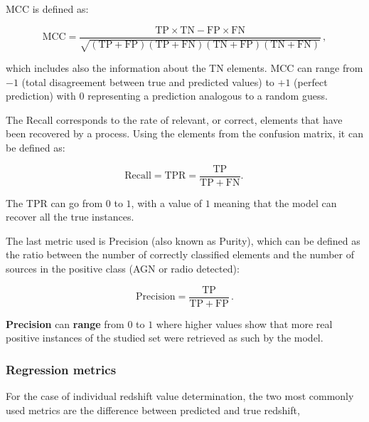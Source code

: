 \documentclass{aa}
\begin{document}
MCC is defined as:

\begin{equation}\label{eq:mcc}
\mathrm{MCC} = \frac{\mathrm{TP} \times \mathrm{TN} - \mathrm{FP} \times \mathrm{FN}}{\sqrt{(\mathrm{TP} + \mathrm{FP}) (\mathrm{TP} + \mathrm{FN}) (\mathrm{TN} + \mathrm{FP}) (\mathrm{TN} + \mathrm{FN})}}\,,
\end{equation}

\noindent which includes also the information about the TN elements. MCC can range from $-1$ (total disagreement between true and predicted values) to $+1$ (perfect prediction) with $0$ representing a prediction analogous to a random guess.

The Recall \citep[also called Completeness, Sensitivity, or True Positive Rate -TPR-;][]{10.2307/4586294} corresponds to the rate of relevant, or correct, elements that have been recovered by a process. Using the elements from the confusion matrix, it can be defined as:

\begin{equation}\label{eq:recall}
\mathrm{Recall} = \mathrm{TPR} = \frac{\mathrm{TP}}{\mathrm{TP} + \mathrm{FN}}.\,
\end{equation}

The TPR can go from $0$ to $1$, with a value of $1$ meaning that the model can recover all the true instances. 

The last metric used is Precision (also known as Purity), which can be defined as the ratio between the number of correctly classified elements and the number of sources in the positive class (AGN or radio detected): 

\begin{equation}\label{eq:precision}
\mathrm{Precision} = \frac{\mathrm{TP}}{\mathrm{TP} + \mathrm{FP}}\,.
\end{equation}

\textbf{Precision} can \textbf{range} from $0$ to $1$ where higher values show that more real positive instances of the studied set were retrieved as such by the model.

\subsubsection{Regression metrics}\label{sec:metrics_regression}

For the case of individual redshift value determination, the two most commonly used metrics are the difference between predicted and true redshift,
\end{document}
